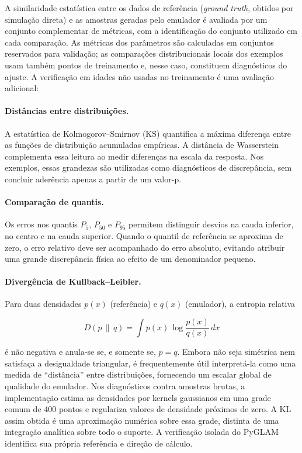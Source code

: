 A similaridade estatística entre os dados de referência (\textit{ground truth}, obtidos por simulação direta) e as amostras geradas pelo emulador é avaliada por um conjunto complementar de métricas, com a identificação do conjunto utilizado em cada comparação. As métricas dos parâmetros são calculadas em conjuntos reservados para validação; as comparações distribucionais locais dos exemplos usam também pontos de treinamento e, nesse caso, constituem diagnósticos do ajuste. A verificação em idades não usadas no treinamento é uma avaliação adicional:

\paragraph{Distâncias entre distribuições.} A estatística de Kolmogorov--Smirnov (KS) \parencite{massey1951} quantifica a máxima diferença entre as funções de distribuição acumuladas empíricas. A distância de Wasserstein complementa essa leitura ao medir diferenças na escala da resposta. Nos exemplos, essas grandezas são utilizadas como diagnósticos de discrepância, sem concluir aderência apenas a partir de um valor-p.

\paragraph{Comparação de quantis.} Os erros nos quantis $P_5$, $P_{50}$ e $P_{95}$ permitem distinguir desvios na cauda inferior, no centro e na cauda superior. Quando o quantil de referência se aproxima de zero, o erro relativo deve ser acompanhado do erro absoluto, evitando atribuir uma grande discrepância física ao efeito de um denominador pequeno.

\paragraph{Diverg\^encia de Kullback--Leibler.} Para duas densidades $p(x)$ (referência) e $q(x)$ (emulador), a entropia relativa \parencite{kullback1951, cover2006}

\begin{equation}
D(p \,\|\, q) = \int p(x)\, \log \frac{p(x)}{q(x)}\, dx
\label{eq:kl_continua}
\end{equation}

\noindent é não negativa e anula-se se, e somente se, $p = q$. Embora não seja simétrica nem satisfaça a desigualdade triangular, é frequentemente útil interpretá-la como uma medida de ``distância'' entre distribuições, fornecendo um escalar global de qualidade do emulador. Nos diagnósticos contra amostras brutas, a implementação estima as densidades por kernels gaussianos em uma grade comum de 400 pontos e regulariza valores de densidade próximos de zero. A KL assim obtida é uma aproximação numérica sobre essa grade, distinta de uma integração analítica sobre todo o suporte. A verificação isolada do PyGLAM identifica sua própria referência e direção de cálculo.

